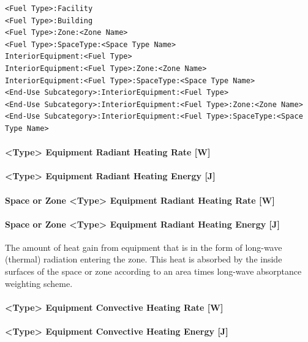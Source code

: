 \begin{lstlisting}
<Fuel Type>:Facility
<Fuel Type>:Building
<Fuel Type>:Zone:<Zone Name>
<Fuel Type>:SpaceType:<Space Type Name>
InteriorEquipment:<Fuel Type>
InteriorEquipment:<Fuel Type>:Zone:<Zone Name>
InteriorEquipment:<Fuel Type>:SpaceType:<Space Type Name>
<End-Use Subcategory>:InteriorEquipment:<Fuel Type>
<End-Use Subcategory>:InteriorEquipment:<Fuel Type>:Zone:<Zone Name>
<End-Use Subcategory>:InteriorEquipment:<Fuel Type>:SpaceType:<Space Type Name>
\end{lstlisting}

\paragraph{<Type> Equipment Radiant Heating Rate {[}W{]}}\label{equipment-radiant-heating-rate-w}

\paragraph{<Type> Equipment Radiant Heating Energy {[}J{]}}\label{equipment-radiant-heating-energy-j}

\paragraph{Space or Zone <Type> Equipment Radiant Heating Rate {[}W{]}}\label{zone-equipment-radiant-heating-rate-w}

\paragraph{Space or Zone <Type> Equipment Radiant Heating Energy {[}J{]}}\label{zone-equipment-radiant-heating-energy-j}

The amount of heat gain from equipment that is in the form of long-wave (thermal) radiation entering the zone. This heat is absorbed by the inside surfaces of the space or zone according to an area times long-wave absorptance weighting scheme.

\paragraph{<Type> Equipment Convective Heating Rate {[}W{]}}\label{equipment-convective-heating-rate-w}

\paragraph{<Type> Equipment Convective Heating Energy {[}J{]}}\label{equipment-convective-heating-energy-j}


